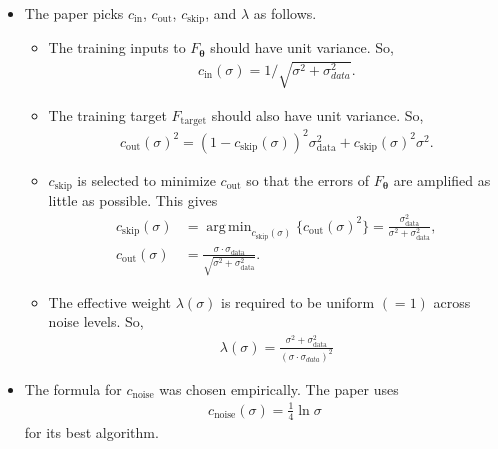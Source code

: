 \documentclass[10pt]{article}
\newcommand{\ves}[1]{\boldsymbol{#1}}
\newcommand{\mrm}[1]{\mathrm{#1}}
\newcommand{\data}{\mathrm{data}}
\DeclareMathOperator*{\argmin}{arg\,min}
\begin{document}
\begin{itemize}
  \item The paper picks $c_{\mrm{in}}$, $c_{\mrm{out}}$, $c_{\mrm{skip}}$, and $\lambda$ as follows.
  \begin{itemize}
    \item The training inputs to $F_{\ves{\theta}}$ should have unit variance. So,
    \begin{align*}
      c_{\mrm{in}}(\sigma) = 1/\sqrt{\sigma^2 + \sigma_{data}^2}.
    \end{align*}
    \item The training target $F_{\mrm{target}}$ should also have unit variance. So,
    \begin{align*}
      c_{\mrm{out}}(\sigma)^2 = (1 - c_{\mrm{skip}}(\sigma))^2 \sigma_{\data}^2 + c_{\mrm{skip}}(\sigma)^2 \sigma^2.
    \end{align*}

    \item $c_{\mrm{skip}}$ is selected to minimize $c_{\mrm{out}}$ so that the errors of $F_{\ves{\theta}}$ are amplified as little as possible. This gives
    \begin{align*}
      c_{\mrm{skip}}(\sigma) &= \argmin_{c_{\mrm{skip}}(\sigma)} \Big\{ c_{\mrm{out}}(\sigma)^2 \Big\} = \frac{\sigma_{\data}^2}{\sigma^2 + \sigma_{\data}^2}, \\
      c_{\mrm{out}}(\sigma) &= \frac{\sigma \cdot \sigma_{\data}}{\sqrt{\sigma^2 + \sigma_{\data}^2}}.
    \end{align*}

    \item The effective weight $\lambda(\sigma)$ is required to be uniform $(=1)$ across noise levels. So,
    \begin{align*}
      \lambda(\sigma) = \frac{\sigma^2 + \sigma_{\data}^2}{(\sigma \cdot \sigma_{data})^2}
    \end{align*}
  \end{itemize}  

  \item The formula for $c_{\mrm{noise}}$ was chosen empirically. The paper uses
  \begin{align*}
    c_{\mrm{noise}}(\sigma) = \frac{1}{4} \ln \sigma
  \end{align*}
  for its best algorithm.


\end{itemize}
\end{document}
